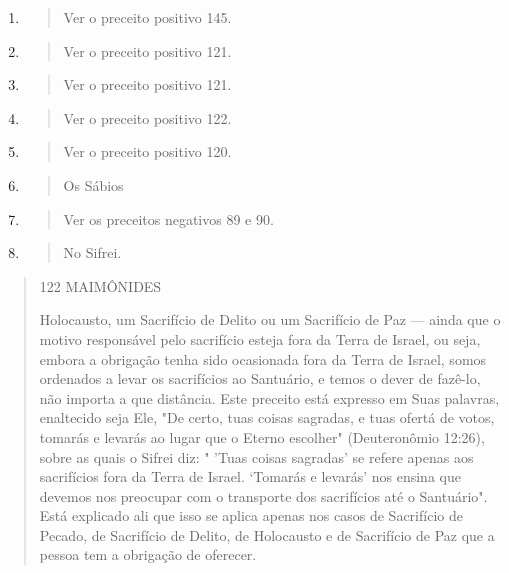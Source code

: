 \begin{enumerate}
\def\labelenumi{\arabic{enumi}.}
\setcounter{enumi}{108}
\item
  \begin{quote}
  Ver o preceito positivo 145.
  \end{quote}
\item
  \begin{quote}
  Ver o preceito positivo 121.
  \end{quote}
\item
  \begin{quote}
  Ver o preceito positivo 121.
  \end{quote}
\item
  \begin{quote}
  Ver o preceito positivo 122.
  \end{quote}
\item
  \begin{quote}
  Ver o preceito positivo 120.
  \end{quote}
\item
  \begin{quote}
  Os Sábios
  \end{quote}
\item
  \begin{quote}
  Ver os preceitos negativos 89 e 90.
  \end{quote}
\item
  \begin{quote}
  No Sifrei.
  \end{quote}
\end{enumerate}

\begin{quote}
122 MAIMÔNIDES

Holocausto, um Sacrifício de Delito ou um Sacrifício de Paz --- ainda
que o mo­tivo responsável pelo sacrifício esteja fora da Terra de
Israel, ou seja, embora a obrigação tenha sido ocasionada fora da Terra
de Israel, somos ordenados a levar os sacrifícios ao Santuário, e temos
o dever de fazê-lo, não importa a que distância. Este preceito está
expresso em Suas palavras, enaltecido seja Ele, "De certo, tuas coisas
sagradas, e tuas ofertá de votos, tomarás e levarás ao lugar que o
Eterno escolher" (Deuteronômio 12:26), sobre as quais o Sifrei diz: "
'Tuas coisas sagradas' se refere apenas aos sacrifícios fora da Terra de
Israel. `Tomarás e levarás' nos ensina que devemos nos preocupar com o
transporte dos sacrifícios até o Santuário". Está explicado ali que isso
se aplica apenas nos casos de Sacrifício de Pecado, de Sacrifício de
Delito, de Holocausto e de Sacri­fício de Paz que a pessoa tem a
obrigação de oferecer.
\end{quote}

